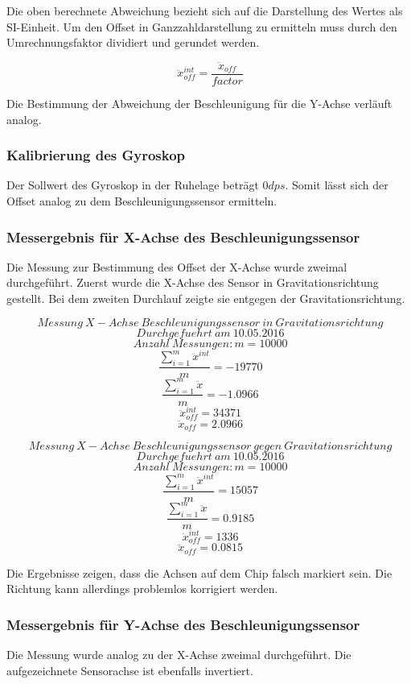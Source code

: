 \documentclass{article}
\begin{document}
Die oben berechnete Abweichung bezieht sich auf die Darstellung des Wertes als SI-Einheit. Um den Offset in Ganzzahldarstellung zu ermitteln muss durch den Umrechnungsfaktor dividiert und gerundet werden.

\[\ \ddot{x}_{off}^{int} = \frac{\ddot{x}_{off}}{factor} \]

Die Bestimmung der Abweichung der Beschleunigung für die Y-Achse verläuft analog.

\subsubsection{Kalibrierung des Gyroskop}
Der Sollwert des Gyroskop in der Ruhelage beträgt $0 dps$. Somit lässt sich der Offset analog zu dem Beschleunigungssensor ermitteln.

\subsubsection{Messergebnis für X-Achse des Beschleunigungssensor}
Die Messung zur Bestimmung des Offset der X-Achse wurde zweimal durchgeführt. Zuerst wurde die X-Achse des Sensor in Gravitationsrichtung gestellt. Bei dem zweiten Durchlauf zeigte sie entgegen der Gravitationsrichtung.

\[\ Messung \ X-Achse \ Beschleunigungssensor \ in \ Gravitationsrichtung \]
\[\ Durchgefuehrt \ am \ 10.05.2016 \]
\[\ Anzahl \ Messungen : m = 10000 \]
\[\ \frac{\sum_{i = 1}^{m} \ddot{x}^{int}}{m} = -19770 \]
\[\ \frac{\sum_{i = 1}^{m} \ddot{x}}{m} = -1.0966 \]
\[\ \ddot{x}_{off}^{int} = 34371 \]
\[\ \ddot{x}_{off} = 2.0966 \]

\[\ Messung \ X-Achse \ Beschleunigungssensor \ gegen \ Gravitationsrichtung \]
\[\ Durchgefuehrt \ am \ 10.05.2016 \]
\[\ Anzahl \ Messungen : m = 10000 \]
\[\ \frac{\sum_{i = 1}^{m} \ddot{x}^{int}}{m} = 15057 \]
\[\ \frac{\sum_{i = 1}^{m} \ddot{x}}{m} = 0.9185 \]
\[\ \ddot{x}_{off}^{int} = 1336 \]
\[\ \ddot{x}_{off} = 0.0815 \]

Die Ergebnisse zeigen, dass die Achsen auf dem Chip falsch markiert sein. Die Richtung kann allerdings problemlos korrigiert werden.

\subsubsection{Messergebnis für Y-Achse des Beschleunigungssensor}
Die Messung wurde analog zu der X-Achse zweimal durchgeführt. Die aufgezeichnete Sensorachse ist ebenfalls invertiert.
\end{document}
